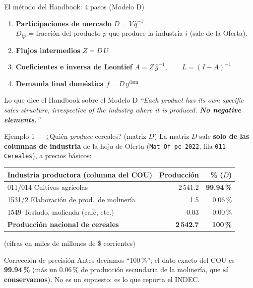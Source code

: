 \documentclass[aspectratio=169,10pt]{beamer}
\newcommand{\hb}[1]{\textit{\color{gris}\small ``#1''}}
\newcommand{\dg}[1]{\widehat{#1}}
\begin{document}
\begin{frame}{El método del Handbook: 4 pasos (Modelo D)}
  \begin{enumerate}
    \item[\textbf{1}] \textbf{Participaciones de mercado} \hfill
      $\displaystyle D = V\,\dg{q}^{-1}$ \\
      {\footnotesize $D_{ip}$ = fracción del producto $p$ que produce la industria $i$ \; (sale de la Oferta).}
    \item[\textbf{2}] \textbf{Flujos intermedios} \hfill
      $\displaystyle Z = D\,U$ 
    \item[\textbf{3}] \textbf{Coeficientes e inversa de Leontief} \hfill
      $\displaystyle A = Z\,\dg{g}^{-1}, \qquad L = (I-A)^{-1}$
    \item[\textbf{4}] \textbf{Demanda final doméstica} \hfill
      $\displaystyle f = D\,y^{\text{dom}}$
  \end{enumerate}
  \vspace{0.6em}
  \begin{block}{Lo que dice el Handbook sobre el Modelo D}
  \hb{Each product has its own specific sales structure, irrespective of the industry where it is produced. \textbf{No negative elements.}}
  \end{block}
\end{frame}

\begin{frame}{Ejemplo 1 — ¿Quién \emph{produce} cereales? (matriz $D$)}
  La matriz $D$ sale \textbf{solo de las columnas de industria} de la hoja de Oferta
  (\texttt{Mat\_Of\_pc\_2022}, fila \texttt{011 - Cereales}), a precios básicos:
  \begin{center}
  \begin{tabular}{lrr}
    \toprule
    Industria productora (columna del COU) & Producción & \% ($D$) \\
    \midrule
    011/014 \; Cultivos agrícolas & 2\,541.2 & \textbf{99.94\,\%} \\
    1531/2 \; Elaboración de prod.\ de molinería & 1.5 & 0.06\,\% \\
    1549 \; Tostado, molienda (café, etc.) & 0.03 & 0.00\,\% \\
    \midrule
    \textbf{Producción nacional de cereales} & \textbf{2\,542.7} & \textbf{100\,\%} \\
    \bottomrule
  \end{tabular}
  \end{center}
  \footnotesize\color{gris}\hfill (cifras en miles de millones de \$ corrientes)
  \begin{alertblock}{Corrección de precisión}
  \normalsize\color{black} Antes decíamos ``100\,\%''; el dato exacto del COU es \textbf{99.94\,\%}
  (más un 0.06\,\% de producción secundaria de la molinería, que \textbf{sí conservamos}). No es un supuesto: es lo que reporta el INDEC.
  \end{alertblock}
\end{frame}
\end{document}
